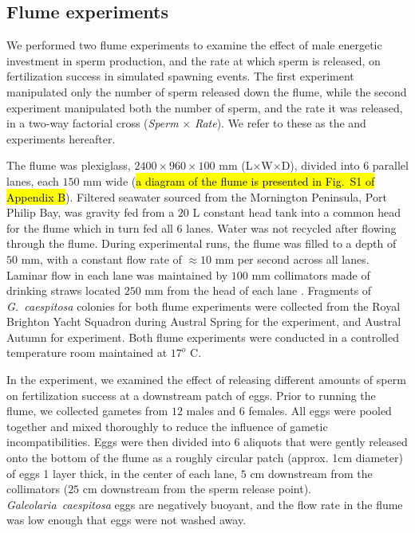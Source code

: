 \documentclass{article}
\begin{document}
	\subsection*{Flume experiments}
	We performed two flume experiments to examine the effect of male energetic investment in sperm production, and the rate at which sperm is released, on fertilization success in simulated spawning events. The first experiment manipulated only the number of sperm released down the flume, while the second experiment manipulated both the number of sperm, and the rate it was released, in a two-way factorial cross (\textit{Sperm} $\times$ \textit{Rate}). We refer to these as the  and  experiments hereafter. 

	The flume was plexiglass, $2400 \times 960 \times 100$ mm (L$\times$W$\times$D), divided into $6$ parallel lanes, each $150$ mm wide (\hl{a diagram of the flume is presented in Fig.~S1 of Appendix B}). Filtered seawater sourced from the Mornington Peninsula, Port Philip Bay, was gravity fed from a $20$ L constant head tank into a common head for the flume which in turn fed all $6$ lanes. Water was not recycled after flowing through the flume. During experimental runs, the flume was filled to a depth of $50$ mm, with a constant flow rate of $\approx 10$ mm per second across all lanes. Laminar flow in each lane was maintained by $100$ mm collimators made of drinking straws located $250$ mm from the head of each lane \citep{YundMeidel2003}. Fragments of \textit{G.~caespitosa} colonies for both flume experiments were collected from the Royal Brighton Yacht Squadron during Austral Spring for the  experiment, and Austral Autumn for  experiment. Both flume experiments were conducted in a controlled temperature room maintained at $17^o$ C.

	In the  experiment, we examined the effect of releasing different amounts of sperm on fertilization success at a downstream patch of eggs. Prior to running the flume, we collected gametes from $12$ males and $6$ females. All eggs were pooled together and mixed thoroughly to reduce the influence of gametic incompatibilities. Eggs were then divided into $6$ aliquots that were gently released onto the bottom of the flume as a roughly circular patch (approx. 1cm diameter) of eggs 1 layer thick, in the center of each lane, $5$ cm downstream from the collimators ($25$ cm downstream from the sperm release point). \textit{Galeolaria~caespitosa} eggs are negatively buoyant, and the flow rate in the flume was low enough that eggs were not washed away. 
\end{document}
